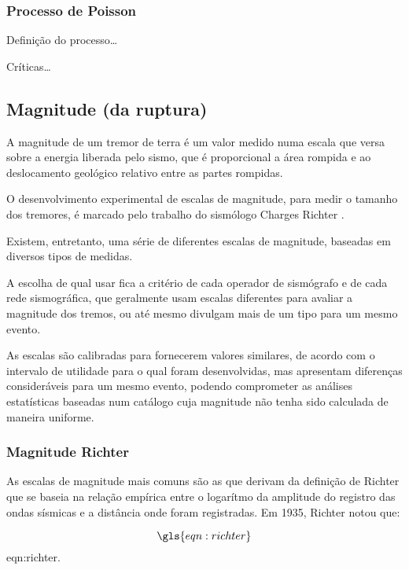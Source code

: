 \subsubsection{Processo de Poisson}
\label{sec:processo_de_Poisson}

Definição do processo\ldots

Críticas\ldots

 
\subsection{Magnitude (da ruptura)}
\label{sec:magnitude}

A magnitude de um tremor de terra é um valor medido numa escala que versa sobre a energia liberada pelo sismo, que é 
proporcional a área rompida e ao deslocamento geológico relativo entre as partes rompidas.

O desenvolvimento experimental de escalas de magnitude, para medir o tamanho dos tremores,
é marcado pelo trabalho do sismólogo Charges Richter \citep{richter_1935}.

Existem, entretanto, uma série de diferentes escalas de magnitude,
baseadas em diversos tipos de medidas. 

A escolha de qual usar fica a critério
de cada operador de sismógrafo e de cada rede sismográfica, que geralmente usam escalas diferentes
para avaliar a magnitude dos tremos, ou até mesmo divulgam mais de um tipo para
um mesmo evento.

As escalas são calibradas para fornecerem valores similares, de acordo com
o intervalo de utilidade para o qual foram desenvolvidas, mas apresentam diferenças consideráveis para um mesmo evento, 
podendo comprometer as análises estatísticas baseadas num catálogo cuja magnitude não tenha sido calculada de maneira uniforme.


\subsubsection{Magnitude Richter}
\label{sec:magnitude_richter}

As escalas de magnitude mais comuns são as que derivam da definição de Richter \citep{richter_1935}
que se baseia na relação empírica entre o logarítmo da amplitude do registro das ondas sísmicas e a distância onde foram
registradas. Em 1935, Richter notou que:

\begin{equation}
	\gls{eqn:richter}
	\label{eq:richter}
\end{equation}
\glsdesc*{eqn:richter}.


